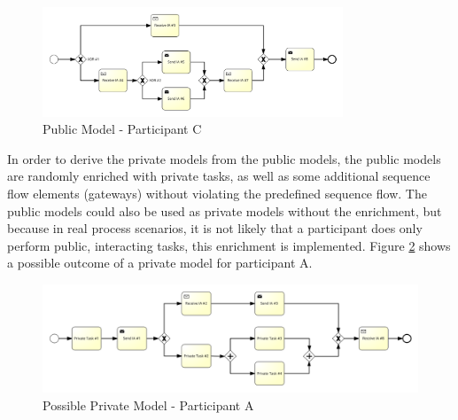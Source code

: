 \begin{figure}[H]
\centering
\includegraphics[width=0.8\textwidth]{src/images/choreo2public_pub3.png}
\caption{Public Model - Participant C}
\label{fig:choreo2public_pub3}
\end{figure}

In order to derive the private models from the public models, the public models are randomly enriched with private tasks, as well as some additional sequence flow elements (gateways) without violating the predefined sequence flow. The public models could also be used as private models without the enrichment, but because in real process scenarios, it is not likely that a participant does only perform public, interacting tasks, this enrichment is implemented. Figure \ref{fig:choreo2public_pr1} shows a possible outcome of a private model for participant A. 

\begin{figure}[H]
\includegraphics[width=1\textwidth]{src/images/choreo2public_pr1.png}
\caption{Possible Private Model - Participant A}
\label{fig:choreo2public_pr1}
\end{figure}

